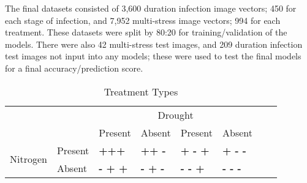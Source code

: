 \documentclass[../../Paper.tex]{subfiles}
\begin{document}
The final datasets consisted of 3,600 duration infection image vectors; 450 for each stage of infection, and 7,952 multi-stress image vectors; 994 for each treatment. These datasets were split by 80:20 for training/validation of the models. There were also 42 multi-stress test images, and 209 duration infection test images not input into any models; these were used to test the final models for a final accuracy/prediction score.

\begin{table*}[!t]
\centering
\caption{Treatment Types}
\label{my-label}
\begin{tabular}{clllllll}
\cline{3-6}
\multicolumn{1}{l}{}                            & \multicolumn{1}{l|}{}                         & \multicolumn{4}{c|}{Drought}                                                                                                                                                                                              &           &           \\ \cline{3-6}
\multicolumn{1}{l}{}                            & \multicolumn{1}{l|}{}                         & \multicolumn{1}{l|}{Present}                         & \multicolumn{1}{l|}{Absent}                          & \multicolumn{1}{l|}{Present}                         & \multicolumn{1}{l|}{Absent}                          &           &           \\ \cline{1-6}
\multicolumn{1}{|c|}{\multirow{4}{*}{Nitrogen}} & \multicolumn{1}{l|}{\multirow{2}{*}{Present}} & \multicolumn{1}{l|}{\multirow{2}{*}{\textbf{+++}}}   & \multicolumn{1}{l|}{\multirow{2}{*}{\textbf{++ -}}}  & \multicolumn{1}{l|}{\multirow{2}{*}{\textbf{+ - +}}} & \multicolumn{1}{l|}{\multirow{2}{*}{\textbf{+ - -}}} &           &           \\
\multicolumn{1}{|c|}{}                          & \multicolumn{1}{l|}{}                         & \multicolumn{1}{l|}{}                                & \multicolumn{1}{l|}{}                                & \multicolumn{1}{l|}{}                                & \multicolumn{1}{l|}{}                                & \textbf{} & \textbf{} \\ \cline{2-6}
\multicolumn{1}{|c|}{}                          & \multicolumn{1}{l|}{\multirow{2}{*}{Absent}}  & \multicolumn{1}{l|}{\multirow{2}{*}{\textbf{- + +}}} & \multicolumn{1}{l|}{\multirow{2}{*}{\textbf{- + -}}} & \multicolumn{1}{l|}{\multirow{2}{*}{\textbf{- - +}}} & \multicolumn{1}{l|}{\multirow{2}{*}{\textbf{- - -}}} & \textbf{} & \textbf{} \\

\end{tabular}
\end{table*}
\end{document}
